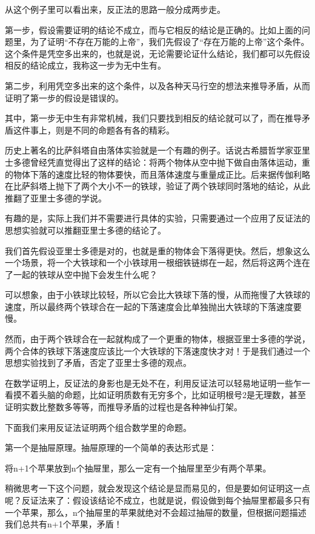 \documentclass[export, 12pt, letterpaper]{ctexrep}
\newenvironment{shadedquotation}
 {\begin{shaded*}
  \quoting[leftmargin=5pt, rightmargin=5pt, vskip=0pt]
 }
 {\endquoting
 \end{shaded*}
}
\begin{document}
从这个例子里可以看出来，反正法的思路一般分成两步走。

第一步，假设需要证明的结论不成立，而与它相反的结论是正确的。比如上面的问题里，为了证明“不存在万能的上帝”，我们先假设了“存在万能的上帝”这个条件。这个条件是凭空多出来的，也就是说，无论需要论证什么结论，我们都可以先假设相反的结论成立，我称这一步为无中生有。

第二步，利用凭空多出来的这个条件，以及各种天马行空的想法来推导矛盾，从而证明了第一步的假设是错误的。

其中，第一步无中生有非常机械，我们只要找到相反的结论就可以了，而在推导矛盾这件事上，则是不同的命题各有各的精彩。

历史上著名的比萨斜塔自由落体实验就是一个有趣的例子。话说古希腊哲学家亚里士多德曾经凭直觉得出了这样的结论：将两个物体从空中抛下做自由落体运动，重的物体下落的速度比轻的物体要快，而且落体速度与重量成正比。后来据传伽利略在比萨斜塔上抛下了两个大小不一的铁球，验证了两个铁球同时落地的结论，从此推翻了亚里士多德的学说。

有趣的是，实际上我们并不需要进行具体的实验，只需要通过一个应用了反证法的思想实验就可以推翻亚里士多德的结论了。

我们首先假设亚里士多德是对的，也就是重的物体会下落得更快。然后，想象这么一个场景，将一个大铁球和一个小铁球用一根细铁链绑在一起，然后将这两个连在了一起的铁球从空中抛下会发生什么呢？

可以想象，由于小铁球比较轻，所以它会比大铁球下落的慢，从而拖慢了大铁球的速度，所以最终两个铁球合在一起的下落速度会比单独抛出大铁球的下落速度要慢。

然而，由于两个铁球合在一起就构成了一个更重的物体，根据亚里士多德的学说，两个合体的铁球下落速度应该比一个大铁球的下落速度快才对！于是我们通过一个思想实验找到了矛盾，否定了亚里士多德的观点。

在数学证明上，反证法的身影也是无处不在，利用反证法可以轻易地证明一些乍一看摸不着头脑的命题，比如证明质数有无穷多个，比如证明根号2是无理数，甚至证明实数比整数多等等，而推导矛盾的过程也是各种神仙打架。

下面我们来用反证法证明两个组合数学里的命题。

第一个是抽屉原理。抽屉原理的一个简单的表达形式是：

\begin{shadedquotation}
\noindent
将n+1个苹果放到n个抽屉里，那么一定有一个抽屉里至少有两个苹果。
\end{shadedquotation}


稍微思考一下这个问题，就会发现这个结论是显而易见的，但是要如何证明这一点呢？反证法来了：假设该结论不成立，也就是说，假设做到每个抽屉里都最多只有一个苹果，那么，n个抽屉里的苹果就绝对不会超过抽屉的数量，但根据问题描述我们总共有n+1个苹果，矛盾！
\end{document}
